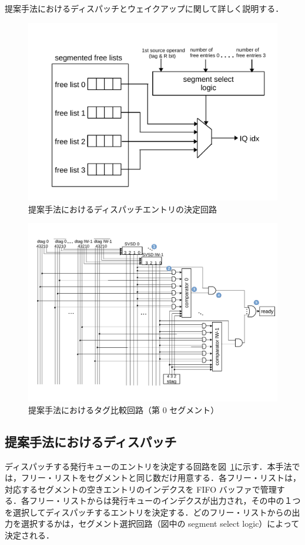 \documentclass[submit,techrep,noauthor]{ipsj}
\newcommand{\fig}[1]{{図~\ref{fig:#1}}}
\begin{document}
提案手法におけるディスパッチとウェイクアップに関して詳しく説明する．

\begin{figure}[tb]
  \centering
  \includegraphics[keepaspectratio, scale=.8]{dispatch.pdf}
  \caption{提案手法におけるディスパッチエントリの決定回路}
  \label{fig:dispatch}
\end{figure}


\begin{figure}[htb]
  \centering
  \includegraphics[width=0.80\hsize]{segmentedIQ_wakeup.pdf}
  \caption{提案手法におけるタグ比較回路（第 0 セグメント）}
  \label{fig:segmentedIQ_wakeup}
\end{figure}

\subsection{提案手法におけるディスパッチ}
ディスパッチする発行キューのエントリを決定する回路を\fig{dispatch}に示す．本手法では，フリー・リストをセグメントと同じ数だけ用意する．各フリー・リストは，対応するセグメントの空きエントリのインデクスを FIFO バッファで管理する．各フリー・リストからは発行キューのインデクスが出力され，その中の１つを選択してディスパッチするエントリを決定する．どのフリー・リストからの出力を選択するかは，セグメント選択回路（図中の segment select logic）によって決定される．
\end{document}
